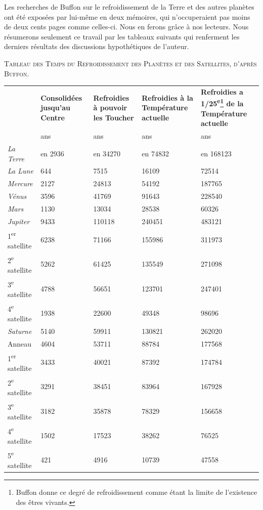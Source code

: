 \documentclass[a4paper, 11pt, oneside]{article}
\begin{document}
Les recherches de Buffon sur le refroidissement de la Terre et des autres planètes ont été exposées par lui-même en deux mémoires, qui n'occuperaient pas moins de deux cents pages comme celles-ci. Nous en ferons grâce à nos lecteurs. Nous résumerons seulement ce travail par les tableaux suivants qui renferment les derniers résultats des discussions hypothétiques de l'auteur.
\begin{center}
\scshape
\small
Tableau des Temps du Refroidissement des Planètes et des Satellites, d'après Buffon.
\end{center}
\begin{center}
    \centering
    \footnotesize
    \begin{longtable}{l p{15mm} p{15mm} p{25mm} p{25mm}}
        ~ & \textbf{Consolidées jusqu'au Centre} & \textbf{Refroidies à pouvoir les Toucher} & \textbf{Refroidies à la Température actuelle} & \textbf{Refroidies a 1/25\textsuperscript{e}\footnote{Buffon donne ce degré de refroidissement comme étant la limite de l'existence des êtres vivants.} de la Température actuelle} \\
        ~ & ans & ans & ans & ans \\
        \emph{La Terre} & en 2936 & en 34270 & en 74832 & en 168123 \\
        \emph{La Lune} & 644 & 7515 & 16109 & 72514 \\
        \emph{Mercure} & 2127 & 24813 & 54192 & 187765 \\
        \emph{Vénus} & 3596 & 41769 & 91643 & 228540 \\
        \emph{Mars} & 1130 & 13034 & 28538 & 60326 \\
        \emph{Jupiter} & 9433 & 110118 & 240451 & 483121 \\
        1\textsuperscript{er} satellite & 6238 & 71166 & 155986 & 311973 \\
        2\textsuperscript{e} satellite & 5262 & 61425 & 135549 & 271098 \\
        3\textsuperscript{e} satellite & 4788 & 56651 & 123701 & 247401 \\
        4\textsuperscript{e} satellite & 1938 & 22600 & 49348 & 98696 \\
        \emph{Saturne} & 5140 & 59911 & 130821 & 262020 \\
        Anneau & 4604 & 53711 & 88784 & 177568 \\
        1\textsuperscript{er} satellite & 3433 & 40021 & 87392 & 174784 \\
        2\textsuperscript{e} satellite & 3291 & 38451 & 83964 & 167928 \\
        3\textsuperscript{e} satellite & 3182 & 35878 & 78329 & 156658 \\
        4\textsuperscript{e} satellite & 1502 & 17523 & 38262 & 76525 \\
        5\textsuperscript{e} satellite & 421 & 4916 & 10739 & 47558 \\
    \end{longtable}
\end{center}
\end{document}
